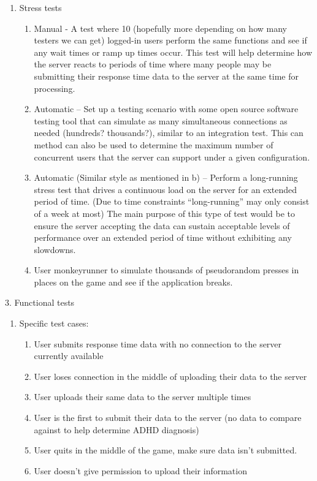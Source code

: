 \documentclass[a4wide]{article}
\begin{document}
\begin{enumerate}
\begin{enumerate}
\item	Stress tests
\begin{enumerate}
\item	Manual - A test where 10 (hopefully more depending on how many testers we can get) logged-in users perform the same functions and see if any wait times or ramp up times occur. This test will help determine how the server reacts to periods of time where many people may be submitting their response time data to the server at the same time for processing.
\item	Automatic – Set up a testing scenario with some open source software testing tool that can simulate as many simultaneous connections as needed (hundreds? thousands?), similar to an integration test. This can method can also be used to determine the maximum number of concurrent users that the server can support under a given configuration.
\item	Automatic (Similar style as mentioned in b) – Perform a long-running stress test that drives a continuous load on the server for an extended period of time.  (Due to time constraints “long-running” may only consist of a week at most) The main purpose of this type of test would be to ensure the server accepting the data can sustain acceptable levels of performance over an extended period of time without exhibiting any slowdowns.
\item	User monkeyrunner to simulate thousands of pseudorandom presses in places on the game and see if the application breaks.
\end{enumerate}
\end{enumerate}
3.	Functional tests
\begin{enumerate}
\item	Specific test cases:
\begin{enumerate}
\item	User submits response time data with no connection to the server currently available
\item	User loses connection in the middle of uploading their data to the server
\item	User uploads their same data to the server multiple times
\item	User is the first to submit their data to the server (no data to compare against to help determine ADHD diagnosis)
\item	User quits in the middle of the game, make sure data isn’t submitted.
\item	User doesn’t give permission to upload their information

\end{enumerate}
\end{enumerate}
\end{enumerate}
\end{document}
